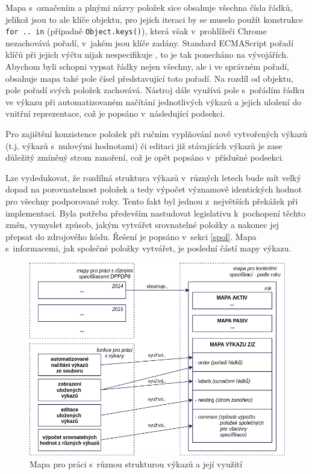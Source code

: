 Mapa s~označením a plnými názvy položek sice obsahuje všechna čísla řádků, jelikož jsou to ale klíče objektu, pro jejich iteraci by se muselo použít konstrukce \texttt{for .. in} (případně \texttt{Object.keys()}), která však v~prohlížeči Chrome nezachovává pořadí, v~jakém jsou klíče zadány. Standard ECMAScript pořadí klíčů při jejich výčtu nijak nespecifikuje \cite{proporder}, to je tak ponecháno na vývojářích. Abychom byli schopni vypsat řádky nejen všechny, ale i ve správném pořadí, obsahuje mapa také pole čísel představující toto pořadí. Na rozdíl od objektu, pole pořadí svých položek zachovává. Nástroj dále využívá pole s~pořádím řádku ve výkazu při automatizovaném načítání jednotlivých výkazů a jejich uložení do vnitřní reprezentace, což je popsáno v~následující podsekci. 

Pro zajištění konzistence položek při ručním vyplňování nově vytvořených výkazů (t.j. výkazů s~nulovými hodnotami) či editaci již stávajících výkazů je zase důležitý zmíněný strom zanoření, což je opět popsáno v~příslušné podsekci.

Lze vydedukovat, že rozdílná struktura výkazů v~různých letech bude mít velký dopad na porovnatelnost položek a tedy výpočet významově identických hodnot pro všechny podporované roky. Tento fakt byl jednou z~největších překážek při implementaci. Byla potřeba především nastudovat legislativu k~pochopení těchto změn, vymyslet způsob, jakým vytvářet srovnatelné položky a nakonec jej přepsat do zdrojového kódu. Řešení je popsáno v~sekci \ref{spol}. Mapa s~informacemi, jak společné položky vytvářet, je poslední částí mapy výkazu.

\begin{figure}[!htb]
  \centering
  \includegraphics[width=13.5cm]{img/dppdp8_maps.png}
  \caption{Mapa pro práci s~různou strukturou výkazů a její využití}
\end{figure}

